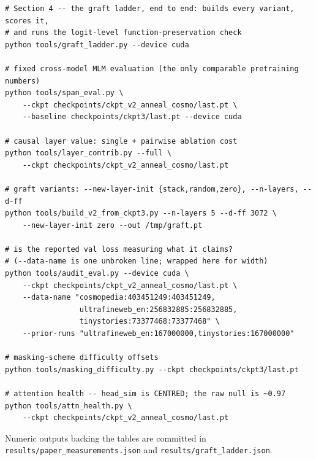 \documentclass[11pt,a4paper]{article}
\begin{document}
{\small\begin{verbatim}
# Section 4 -- the graft ladder, end to end: builds every variant, scores it,
# and runs the logit-level function-preservation check
python tools/graft_ladder.py --device cuda

# fixed cross-model MLM evaluation (the only comparable pretraining numbers)
python tools/span_eval.py \
    --ckpt checkpoints/ckpt_v2_anneal_cosmo/last.pt \
    --baseline checkpoints/ckpt3/last.pt --device cuda

# causal layer value: single + pairwise ablation cost
python tools/layer_contrib.py --full \
    --ckpt checkpoints/ckpt_v2_anneal_cosmo/last.pt

# graft variants: --new-layer-init {stack,random,zero}, --n-layers, --d-ff
python tools/build_v2_from_ckpt3.py --n-layers 5 --d-ff 3072 \
    --new-layer-init zero --out /tmp/graft.pt

# is the reported val loss measuring what it claims?
# (--data-name is one unbroken line; wrapped here for width)
python tools/audit_eval.py --device cuda \
    --ckpt checkpoints/ckpt_v2_anneal_cosmo/last.pt \
    --data-name "cosmopedia:403451249:403451249,
                 ultrafineweb_en:256832885:256832885,
                 tinystories:73377468:73377468" \
    --prior-runs "ultrafineweb_en:167000000,tinystories:167000000"

# masking-scheme difficulty offsets
python tools/masking_difficulty.py --ckpt checkpoints/ckpt3/last.pt

# attention health -- head_sim is CENTRED; the raw null is ~0.97
python tools/attn_health.py \
    --ckpt checkpoints/ckpt_v2_anneal_cosmo/last.pt
\end{verbatim}}

Numeric outputs backing the tables are committed in
\texttt{results/paper\_measurements.json} and \texttt{results/graft\_ladder.json}.
\end{document}
